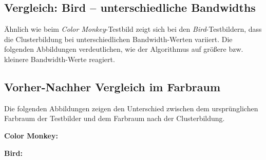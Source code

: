 \newpage

\subsection*{Vergleich: Bird – unterschiedliche Bandwidths}

Ähnlich wie beim \textit{Color Monkey}-Testbild zeigt sich bei den \textit{Bird}-Testbildern, dass die Clusterbildung bei unterschiedlichen Bandwidth-Werten variiert. Die folgenden Abbildungen verdeutlichen, wie der Algorithmus auf größere bzw. kleinere Bandwidth-Werte reagiert.

\begin{minipage}[t]{0.30\textwidth}
\end{minipage}
%
\begin{minipage}[t]{0.30\textwidth}
\end{minipage}
%
\begin{minipage}[t]{0.30\textwidth}
\end{minipage}

\newpage

\subsection*{Vorher-Nachher Vergleich im Farbraum}

Die folgenden Abbildungen zeigen den Unterschied zwischen dem ursprünglichen Farbraum der Testbilder und dem Farbraum nach der Clusterbildung.

\textbf{Color Monkey:}

\begin{minipage}[t]{0.45\linewidth}
\end{minipage}
%
\begin{minipage}[t]{0.45\linewidth}
\end{minipage}


\vspace{0.5cm}
\textbf{Bird:}

